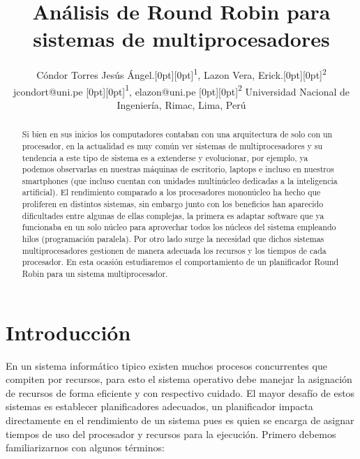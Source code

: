 \documentclass[conference,letterpaper]{IEEEtran}
\DeclareRobustCommand*{\IEEEauthorrefmark}[1]{\raisebox{0pt}[0pt][0pt]{\textsuperscript{\footnotesize #1}}}
\begin{document}
\title
{
An\'alisis de Round Robin para sistemas de multiprocesadores
}

\author
{
\IEEEauthorblockN
{
C\'ondor Torres Jes\'us \'Angel.\IEEEauthorrefmark{1},
Lazon Vera, Erick.\IEEEauthorrefmark{2} 
}                                     
\IEEEauthorblockA
{
jcondort@uni.pe \IEEEauthorrefmark{1},
elazon@uni.pe \IEEEauthorrefmark{2}
}
\IEEEauthorblockA
{
Universidad Nacional de Ingeniería, Rimac, Lima, Perú}
}

\maketitle

\begin{abstract}
Si bien en sus inicios los computadores contaban con una arquitectura de solo con un procesador, en la actualidad es muy común ver sistemas de multiprocesadores y su tendencia a este tipo de sistema es a extenderse y evolucionar, por ejemplo, ya podemos observarlas en nuestras máquinas de escritorio, laptops e incluso en nuestros smartphones (que incluso cuentan con unidades multinúcleo dedicadas a la inteligencia artificial). El rendimiento comparado a los procesadores monon\'ucleo ha hecho que proliferen en distintos sistemas, sin embargo junto con los beneficios han aparecido dificultades entre algunas de ellas complejas, la primera es adaptar software que ya funcionaba en un solo núcleo para aprovechar todos los núcleos del sistema empleando hilos (programación paralela). Por otro lado surge la necesidad que dichos sistemas multiprocesadores gestionen de manera adecuada los recursos y los tiempos de cada procesador. En esta ocasión estudiaremos el comportamiento de un planificador Round Robin para un sistema multiprocesador.
\end{abstract}


\IEEEpeerreviewmaketitle

\vspace{7pt}
\section{Introducción}
En un sistema inform\'atico tipico existen muchos procesos concurrentes que compiten por recursos, para esto el sistema operativo debe manejar la asignación de recursos de forma eficiente y con respectivo cuidado. El mayor desafío de estos sistemas es establecer planificadores adecuados, un planificador impacta directamente en el rendimiento de un sistema pues es quien se encarga de asignar tiempos de uso del procesador y recursos para la ejecución. Primero debemos familiarizarnos con algunos términos:
\end{document}

